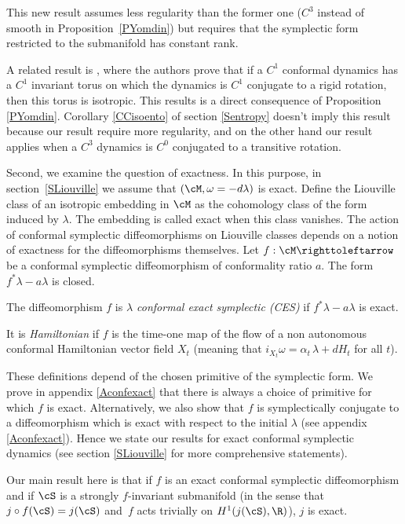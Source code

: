 This new result assumes less regularity than the former one ($C^3$ instead of smooth in Proposition~\ref{PYomdin}) but requires that the symplectic form restricted to the submanifold has constant rank.

A related result is \cite[2.2.1]{CaCeLlA2013}, where the authors prove that if a $C^1$ conformal dynamics has a $C^1$ invariant torus on which the dynamics is $C^1$ conjugate to a rigid rotation, then this torus is isotropic. This results is a direct consequence of Proposition \ref{PYomdin}. Corollary \ref{CCisoento} of section \ref{Sentropy} doesn't imply this result because our result require more regularity, and on the other hand our result applies when a $C^3$ dynamics is $C^0$ conjugated to a transitive rotation.

Second, we examine the question of exactness. In this purpose, in section~\ref{SLiouville} we assume that $(\cM, \omega=-d\lambda)$ is exact. Define the Liouville class of an isotropic embedding in $\cM$ as the cohomology class of the form induced by $\lambda$. The embedding is called \hbox{exact} when this class vanishes.
The action of conformal symplectic diffeomorphisms on \hbox{Liouville} classes depends on a notion of exactness for the diffeomorphisms themselves. Let $f: \cM \righttoleftarrow$ be a conformal symplectic diffeomorphism of conformality ratio $a$. The form $f^*\lambda-a\lambda$ is closed.

\begin{definition}
The diffeomorphism $f$ is \emph{$\lambda$ conformal exact symplectic (CES)} if $f^*\lambda-a\lambda$ is exact.

It is \emph{Hamiltonian} if $f$ is the time-one map of the flow of a non autonomous conformal Hamiltonian vector field $X_t$ (meaning that $i_{X_t}\omega = \alpha_t \, \lambda + dH_t$ for all $t$).
\end{definition}

These definitions depend of the chosen primitive of the symplectic form. We prove in appendix \ref{Aconfexact} that there is always a choice of primitive for which $f$ is exact. Alternatively, we also show that $f$ is symplectically conjugate to a diffeomorphism which is exact with respect to the initial $\lambda$ (see appendix \ref{Aconfexact}). Hence we state our results for exact conformal symplectic dynamics (see section \ref{SLiouville} for more comprehensive statements).

Our main result here is that if $f$ is an exact conformal symplectic diffeomorphism and if $\cS$ is a strongly $f$-invariant submanifold (in the sense that $j \circ f (\cS) = j(\cS)$ and~$f$ acts trivially on $H^1(j(\cS),\R)$), $j$ is exact.

